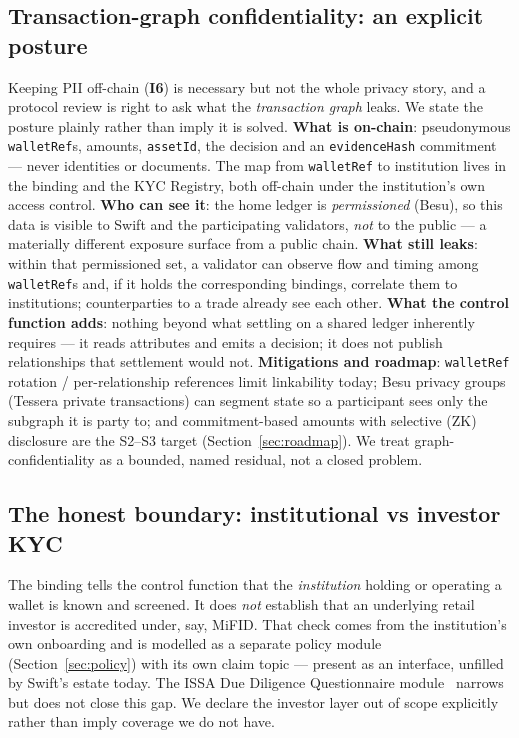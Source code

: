 \documentclass[11pt,a4paper]{article}
\newcommand{\Iref}[1]{\textbf{I#1}}
\begin{document}
\subsection{Transaction-graph confidentiality: an explicit posture}
\label{sec:graph-confidentiality}
Keeping PII off-chain (\Iref{6}) is necessary but not the whole privacy story, and
a protocol review is right to ask what the \emph{transaction graph} leaks. We state
the posture plainly rather than imply it is solved. \textbf{What is on-chain}:
pseudonymous \texttt{walletRef}s, amounts, \texttt{assetId}, the decision and an
\texttt{evidenceHash} commitment --- never identities or documents. The map from
\texttt{walletRef} to institution lives in the binding and the KYC Registry, both
off-chain under the institution's own access control. \textbf{Who can see it}: the
home ledger is \emph{permissioned} (Besu), so this data is visible to Swift and the
participating validators, \emph{not} to the public --- a materially different
exposure surface from a public chain. \textbf{What still leaks}: within that
permissioned set, a validator can observe flow and timing among \texttt{walletRef}s
and, if it holds the corresponding bindings, correlate them to institutions;
counterparties to a trade already see each other. \textbf{What the control function
adds}: nothing beyond what settling on a shared ledger inherently requires --- it
reads attributes and emits a decision; it does not publish relationships that
settlement would not. \textbf{Mitigations and roadmap}: \texttt{walletRef}
rotation / per-relationship references limit linkability today; Besu privacy groups
(Tessera private transactions) can segment state so a participant sees only the
subgraph it is party to; and commitment-based amounts with selective (ZK)
disclosure are the S2--S3 target (Section~\ref{sec:roadmap}). We treat
graph-confidentiality as a bounded, named residual, not a closed problem.

\subsection{The honest boundary: institutional vs investor KYC}
The binding tells the control function that the \emph{institution} holding or
operating a wallet is known and screened. It does \emph{not} establish that an
underlying retail investor is accredited under, say, MiFID. That check comes from
the institution's own onboarding and is modelled as a separate policy module
(Section~\ref{sec:policy}) with its own claim topic --- present as an interface,
unfilled by Swift's estate today. The ISSA Due Diligence Questionnaire
module~\cite{swiftkycdata} narrows but does not close this gap. We declare the
investor layer out of scope explicitly rather than imply coverage we do not have.
\end{document}
